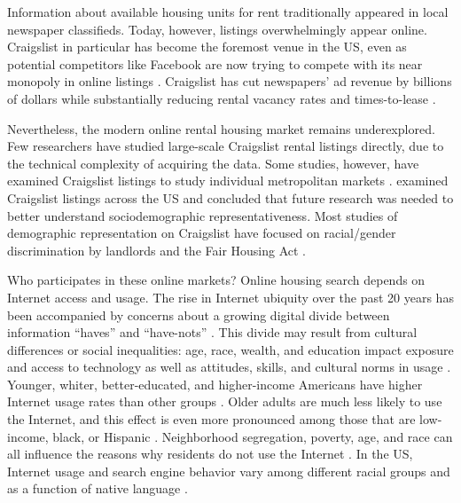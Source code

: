 \documentclass[11pt,onecolumn]{article} %
\begin{document}
Information about available housing units for rent traditionally appeared in local newspaper classifieds. Today, however, listings overwhelmingly appear online. Craigslist in particular has become the foremost venue in the US, even as potential competitors like Facebook are now trying to compete with its near monopoly in online listings \citep{hau_newspaper_2006,brown_rental_2014,yurieff_facebook_2017}. Craigslist has cut newspapers' ad revenue by billions of dollars while substantially reducing rental vacancy rates and times-to-lease \citep{seamans_responses_2014,kroft_does_2014}.

Nevertheless, the modern online rental housing market remains underexplored. Few researchers have studied large-scale Craigslist rental listings directly, due to the technical complexity of acquiring the data. Some studies, however, have examined Craigslist listings to study individual metropolitan markets \citep[e.g.][]{wegmann_understanding_2012,mallach_meeting_2010}. \citet{boeing_new_2017} examined Craigslist listings across the US and concluded that future research was needed to better understand sociodemographic representativeness. Most studies of demographic representation on Craigslist have focused on racial/gender discrimination by landlords \citep{ahmed_can_2010,hanson_landlords_2011,hanson_subtle_2011,hanson_field_2014,hogan_racial_2011,carlsson_discrimination_2014,ghoshal_finding_2015} and the Fair Housing Act \citep[e.g.][]{oliveri_discriminatory_2010,larkin_criminal_2010,wilemon_fair_2009,ross_cyberspace:_2009,kurth_striking_2007}.

Who participates in these online markets? Online housing search depends on Internet access and usage. The rise in Internet ubiquity over the past 20 years has been accompanied by concerns about a growing digital divide between information \enquote{haves} and \enquote{have-nots} \citep{hersberger_are_2003}. This divide may result from cultural differences or social inequalities: age, race, wealth, and education impact exposure and access to technology as well as attitudes, skills, and cultural norms in usage \citep{jones_u.s._2009,robinson_digital_2015}. Younger, whiter, better-educated, and higher-income Americans have higher Internet usage rates than other groups \citep{porter_using_2006}. Older adults are much less likely to use the Internet, and this effect is even more pronounced among those that are low-income, black, or Hispanic \citep{choi_digital_2013}. Neighborhood segregation, poverty, age, and race can all influence the reasons why residents do not use the Internet \citep{mossberger_unraveling_2012}. In the US, Internet usage and search engine behavior vary among different racial groups and as a function of native language \citep{slate_digital_2002,weber_who_2011}.
\end{document}
